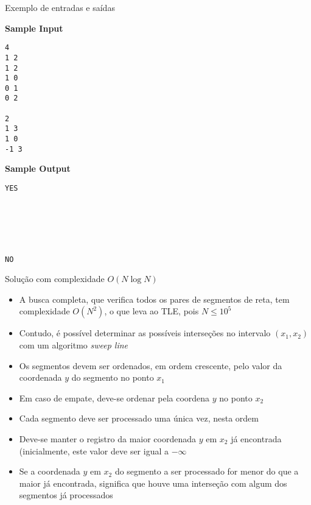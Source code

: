 \begin{frame}[fragile]{Exemplo de entradas e saídas}

\begin{minipage}[t]{0.5\textwidth}
\textbf{Sample Input}
\begin{verbatim}
4
1 2
1 2
1 0
0 1
0 2

2
1 3
1 0
-1 3
\end{verbatim}
\end{minipage}
\begin{minipage}[t]{0.45\textwidth}
\textbf{Sample Output}
\begin{verbatim}
YES






NO
\end{verbatim}
\end{minipage}
\end{frame}

\begin{frame}[fragile]{Solução com complexidade $O(N\log N)$}

    \begin{itemize}
        \item A busca completa, que verifica todos os pares de segmentos de reta, tem
            complexidade $O(N^2)$, o que leva ao TLE, pois $N\leq 10^5$

        \item Contudo, é possível determinar as possíveis interseções no intervalo
            $(x_1, x_2)$ com um algoritmo \textit{sweep line} 

        \item Os segmentos devem ser ordenados, em ordem crescente, pelo valor da coordenada
            $y$ do segmento no ponto $x_1$

        \item Em caso de empate, deve-se ordenar pela coordena $y$ no ponto $x_2$

        \item Cada segmento deve ser processado uma única vez, nesta ordem

        \item Deve-se manter o registro da maior coordenada $y$ em $x_2$ já encontrada 
            (inicialmente, este valor deve ser igual a $-\infty$

        \item Se a coordenada $y$ em $x_2$ do segmento a ser processado for menor do que
            a maior já encontrada, significa que houve uma interseção com algum dos segmentos
            já processados 
    \end{itemize}

\end{frame}

